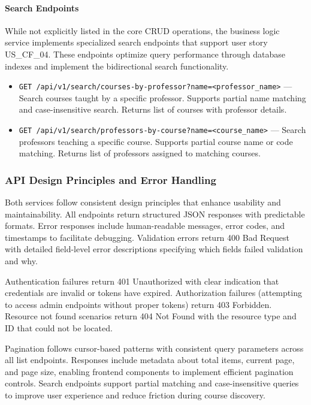 \documentclass[12pt,a4paper]{article}
\begin{document}
\paragraph{Search Endpoints}
While not explicitly listed in the core CRUD operations, the business logic service implements specialized search endpoints that support user story US\_CF\_04. These endpoints optimize query performance through database indexes and implement the bidirectional search functionality.

\begin{itemize}[leftmargin=1.2em]
	\item \texttt{GET /api/v1/search/courses-by-professor?name=<professor\_name>} — Search courses taught by a specific professor. Supports partial name matching and case-insensitive search. Returns list of courses with professor details.
	
	\item \texttt{GET /api/v1/search/professors-by-course?name=<course\_name>} — Search professors teaching a specific course. Supports partial course name or code matching. Returns list of professors assigned to matching courses.
\end{itemize}

\subsubsection{API Design Principles and Error Handling}

Both services follow consistent design principles that enhance usability and maintainability. All endpoints return structured JSON responses with predictable formats. Error responses include human-readable messages, error codes, and timestamps to facilitate debugging. Validation errors return 400 Bad Request with detailed field-level error descriptions specifying which fields failed validation and why.\newline

Authentication failures return 401 Unauthorized with clear indication that credentials are invalid or tokens have expired. Authorization failures (attempting to access admin endpoints without proper tokens) return 403 Forbidden. Resource not found scenarios return 404 Not Found with the resource type and ID that could not be located.\newline

Pagination follows cursor-based patterns with consistent query parameters across all list endpoints. Responses include metadata about total items, current page, and page size, enabling frontend components to implement efficient pagination controls. Search endpoints support partial matching and case-insensitive queries to improve user experience and reduce friction during course discovery.\newline
\end{document}

